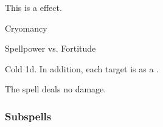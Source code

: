 \par


This is a  effect.

\newpage
\begin{spellsection}{Cryomancy}

\begin{spellheader}
\end{spellheader}

\begin{spellcontent}

\begin{spelltargetinginfo}




\end{spelltargetinginfo}


\begin{spelleffects}




\begin{spellattack}{Spellpower vs. Fortitude}


\spellsuccess
Cold  \minus1d.
In addition, each target is \fatigued as a .



\end{spellattack}





\end{spelleffects}

\end{spellcontent}
\begin{spellfooter}


\end{spellfooter}
\begin{spellsubcontent}


\begin{spellcantrip}
The spell deals no damage.
\end{spellcantrip}


\end{spellsubcontent}
\end{spellsection}


\subsubsection{Subspells}


